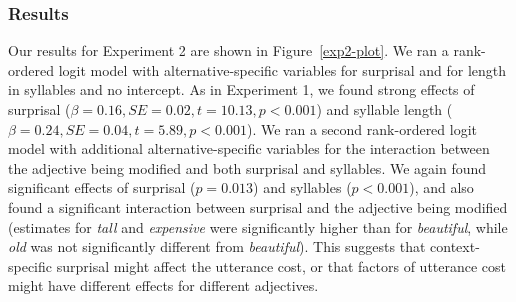 \documentclass[10pt,letterpaper]{article}
\newcommand{\w}[1]{\emph{#1}}
\begin{document}

\subsubsection{Results}

Our results for Experiment 2 are shown in Figure~\ref{exp2-plot}. We ran a rank-ordered logit model \cite{beggs1981, hausman1987} with alternative-specific variables for surprisal and for length in syllables and no intercept. As in Experiment 1, we found strong effects of surprisal ($\beta=0.16, SE=0.02, t=10.13, p<0.001$) and syllable length ($\beta=0.24, SE=0.04, t=5.89, p<0.001$).
We ran a second rank-ordered logit model with additional alternative-specific variables for the interaction between the adjective being modified and both surprisal and syllables. We again found significant effects of surprisal ($p=0.013$) and syllables ($p<0.001$), and also found a significant interaction between surprisal and the adjective being modified (estimates for \w{tall} and \w{expensive} were significantly higher than for \w{beautiful}, while \w{old} was not significantly different from \w{beautiful}).
This suggests that context-specific surprisal might affect the utterance cost, or that factors of utterance cost might have different effects for different adjectives.
\end{document}
